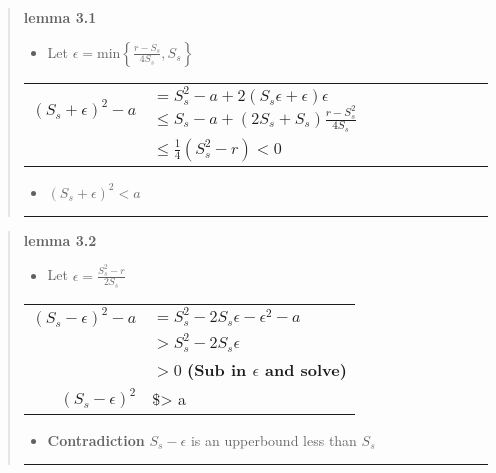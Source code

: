 \documentclass{tufte-book}
\providecommand{\tightlist}{%
  \setlength{\itemsep}{0pt}\setlength{\parskip}{0pt}}
\begin{document}
\begin{quote}
\textbf{lemma 3.1}

\begin{itemize}
\tightlist
\item
  Let \(\epsilon = \text{min} \left\{ \frac{r-S_s}{4S_s}, S_s\right\}\)
\end{itemize}

\begin{longtable}[]{@{}rl@{}}
\toprule
\endhead
\begin{minipage}[t]{0.36\columnwidth}\raggedleft
\((S_s + \epsilon)^2 - a\)\strut
\end{minipage} & \begin{minipage}[t]{0.58\columnwidth}\raggedright
\(=S_s^2 -a + 2 (S_s\epsilon + \epsilon) \epsilon\)
\(\leq S_s - a + (2 S_s + S_s)\frac{r-S_s^2}{4S_s}\)\strut
\end{minipage}\tabularnewline
\begin{minipage}[t]{0.36\columnwidth}\raggedleft
\strut
\end{minipage} & \begin{minipage}[t]{0.58\columnwidth}\raggedright
\(\leq \frac{1}{4}(S_s ^2 -r) < 0\)\strut
\end{minipage}\tabularnewline
\bottomrule
\end{longtable}

\begin{itemize}
\tightlist
\item
  \((S_s + \epsilon)^2 < a\)
\end{itemize}

\begin{center}\rule{0.5\linewidth}{\linethickness}\end{center}
\end{quote}

\begin{quote}
\textbf{lemma 3.2}

\begin{itemize}
\tightlist
\item
  Let \(\epsilon = \frac{S_s^2 -r}{2S_s}\)
\end{itemize}

\begin{longtable}[]{@{}rl@{}}
\toprule
\endhead
\((S_s - \epsilon)^2 - a\) &
\(= S_s^2 - 2 S_s \epsilon - \epsilon^2 -a\)\tabularnewline
& \(> S_s^2 - 2 S_s \epsilon\)\tabularnewline
& \(> 0\) \textbf{(Sub in \(\epsilon\) and solve)}\tabularnewline
\((S_s-\epsilon)^2\) & \$\textgreater{} a\tabularnewline
\bottomrule
\end{longtable}

\begin{itemize}
\tightlist
\item
  \textbf{Contradiction} \(S_s- \epsilon\) is an upperbound less than
  \(S_s\)
\end{itemize}

\begin{center}\rule{0.5\linewidth}{\linethickness}\end{center}
\end{quote}
\end{document}
